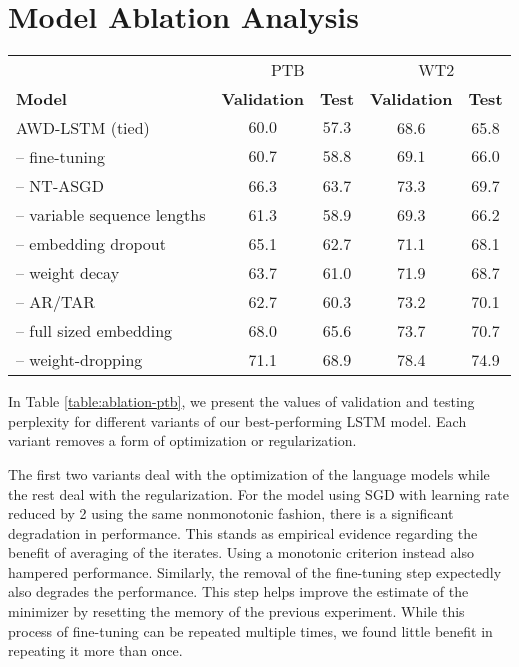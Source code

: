 \documentclass{article}
\begin{document}
\section{Model Ablation Analysis}

\begin{table*}
\center
\begin{tabular}{l|cc|cc}
\toprule
 & \multicolumn{2}{c|}{PTB} & \multicolumn{2}{c}{WT2} \\
\bf Model & \bf Validation &  \bf Test & \bf Validation &  \bf Test \\
\midrule

AWD-LSTM (tied) & $60.0$ & $57.3$ & 68.6 & 65.8\\
\midrule
-- fine-tuning & $60.7$ & $58.8$ & $69.1$ & $66.0$ \\
-- NT-ASGD & 66.3 & 63.7 & 73.3 & 69.7 \\
\midrule
-- variable sequence lengths & 61.3 & 58.9 & 69.3 & 66.2 \\
-- embedding dropout & 65.1 & 62.7 & 71.1 & 68.1 \\
-- weight decay & 63.7 & 61.0 & 71.9 & 68.7 \\
-- AR/TAR & 62.7 & 60.3 & 73.2 & 70.1 \\ 
-- full sized embedding & 68.0 & 65.6 & 73.7 & 70.7 \\
-- weight-dropping & 71.1 & 68.9 & 78.4 & 74.9 \\
\bottomrule
\end{tabular}
\caption{
Model ablations for our best LSTM models reporting results over the validation and test set on Penn Treebank and WikiText-2.
Ablations are split into optimization and regularization variants, sorted according to the achieved validation perplexity on WikiText-2.
}
\label{table:ablation-ptb}
\end{table*}

In Table \ref{table:ablation-ptb}, we present the values of validation and testing perplexity for different variants of our best-performing LSTM model.
Each variant removes a form of optimization or regularization.

The first two variants deal with the optimization of the language models while the rest deal with the regularization.
For the model using SGD with learning rate reduced by 2 using the same nonmonotonic fashion, there is a significant degradation in performance.
This stands as empirical evidence regarding the benefit of averaging of the iterates.
Using a monotonic criterion instead also hampered performance.
Similarly, the removal of the fine-tuning step expectedly also degrades the performance. This step helps improve the estimate of the minimizer by resetting the memory of the previous experiment. While this process of fine-tuning can be repeated multiple times, we found little benefit in repeating it more than once.
\end{document}

